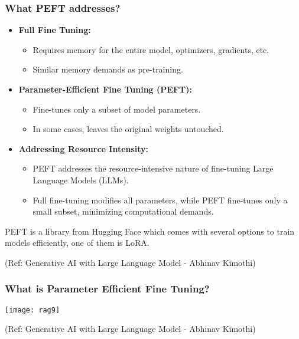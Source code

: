 \begin{frame}[fragile]\frametitle{What PEFT addresses?}

\begin{itemize}
  \item \textbf{Full Fine Tuning:}
    \begin{itemize}
      \item Requires memory for the entire model, optimizers, gradients, etc.
      \item Similar memory demands as pre-training.
    \end{itemize}

  \item \textbf{Parameter-Efficient Fine Tuning (PEFT):}
    \begin{itemize}
      \item Fine-tunes only a subset of model parameters.
      \item In some cases, leaves the original weights untouched.
    \end{itemize}
	
    \item \textbf{Addressing Resource Intensity:}
      \begin{itemize}
        \item PEFT addresses the resource-intensive nature of fine-tuning Large Language Models (LLMs).
        \item Full fine-tuning modifies all parameters, while PEFT fine-tunes only a small subset, minimizing computational demands.
      \end{itemize}	
\end{itemize}

PEFT is a library from Hugging Face which comes with several options to train models efficiently, one of them is LoRA.

{\tiny (Ref: Generative AI with Large Language Model - Abhinav  Kimothi)}

\end{frame}


\begin{frame}[fragile]\frametitle{What is Parameter Efficient Fine Tuning?}


		\begin{center}
		\texttt{[image: rag9]}
		\end{center}

{\tiny (Ref: Generative AI with Large Language Model - Abhinav  Kimothi)}

\end{frame}




